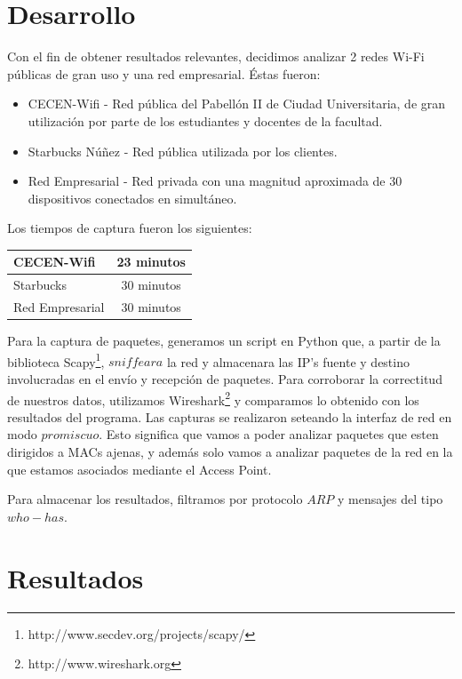\documentclass[10pt, a4paper]{article}
\begin{document}
\section{Desarrollo}

Con el fin de obtener resultados relevantes, decidimos analizar 2 redes Wi-Fi públicas de gran uso y una red empresarial. Éstas fueron:

\begin{itemize}
\item CECEN-Wifi - Red pública del Pabellón II de Ciudad Universitaria, de gran utilización por parte de los estudiantes y docentes de la facultad.
\item Starbucks Núñez - Red pública utilizada por los clientes.
\item Red Empresarial - Red privada con una magnitud aproximada de 30 dispositivos conectados en simultáneo.
\end{itemize}

Los tiempos de captura fueron los siguientes:

\begin{center}
  \begin{tabular}{| l | c |}
    \hline
    CECEN-Wifi & 23 minutos\\ \hline
    Starbucks & 30 minutos\\ \hline
    Red Empresarial & 30 minutos\\
    \hline
  \end{tabular}
\end{center}

Para la captura de paquetes, generamos un script en Python que, a partir de la biblioteca Scapy\footnote{http://www.secdev.org/projects/scapy/}, $sniffeara$ la red y almacenara las IP's fuente y destino involucradas en el envío y recepción de paquetes. Para corroborar la correctitud de nuestros datos, utilizamos Wireshark\footnote{http://www.wireshark.org} y comparamos lo obtenido con los resultados del programa. 
Las capturas se realizaron seteando la interfaz de red en modo $promiscuo$. Esto significa que vamos a poder analizar paquetes que esten dirigidos a MACs ajenas, y además solo vamos a analizar paquetes de la red en la que estamos asociados mediante el Access Point.

Para almacenar los resultados, filtramos por protocolo $ARP$ y mensajes del tipo $who-has$.

\section{Resultados}
\end{document}
